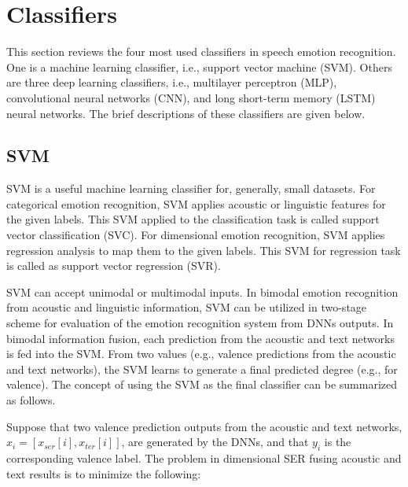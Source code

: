 

\section{Classifiers}
This section reviews the four most used classifiers in speech emotion
recognition.  One is a machine learning classifier, i.e., support vector
machine (SVM). Others are three deep learning classifiers, i.e., multilayer
perceptron (MLP), convolutional neural networks (CNN), and long short-term
memory (LSTM) neural networks. The brief descriptions of these classifiers are
given below.

\subsection{SVM}
SVM is a useful machine learning classifier for, generally, small datasets. For
categorical emotion recognition, SVM applies acoustic or linguistic features
for the given labels.  This SVM applied to the classification task is called
support vector classification (SVC).  For dimensional emotion recognition, SVM
applies regression analysis to map them to the given labels. This SVM for
regression task is called as support vector regression (SVR).

SVM can accept unimodal or multimodal inputs. In bimodal emotion recognition
from acoustic and linguistic information, SVM can be utilized in two-stage
scheme for evaluation of the emotion recognition system from DNNs outputs. In
bimodal information fusion, each prediction from the acoustic and text networks
is fed into the SVM.  From two values (e.g., valence predictions from the
acoustic and text networks), the SVM learns to generate a final predicted
degree (e.g., for valence). The concept of using the SVM as the final
classifier can be summarized as follows.

Suppose that two valence prediction outputs from the acoustic and text
networks, $x_i = [x_{ser}[i], x_{ter}[i]]$, are generated by the DNNs, and that
$y_i$ is the corresponding valence label. The problem in dimensional SER fusing
acoustic and text results is to minimize the following: 

